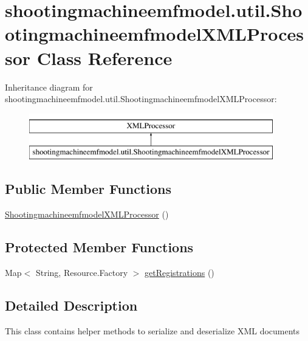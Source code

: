 \hypertarget{classshootingmachineemfmodel_1_1util_1_1_shootingmachineemfmodel_x_m_l_processor}{\section{shootingmachineemfmodel.\-util.\-Shootingmachineemfmodel\-X\-M\-L\-Processor Class Reference}
\label{classshootingmachineemfmodel_1_1util_1_1_shootingmachineemfmodel_x_m_l_processor}
}
Inheritance diagram for shootingmachineemfmodel.\-util.\-Shootingmachineemfmodel\-X\-M\-L\-Processor\-:\begin{figure}[H]
\begin{center}
\leavevmode
\includegraphics[height=2.000000cm]{classshootingmachineemfmodel_1_1util_1_1_shootingmachineemfmodel_x_m_l_processor}
\end{center}
\end{figure}
\subsection*{Public Member Functions}
\begin{DoxyCompactItemize}
\item 
\hyperlink{classshootingmachineemfmodel_1_1util_1_1_shootingmachineemfmodel_x_m_l_processor_a94ae9b5dca785e27cc81584508cf5a11}{Shootingmachineemfmodel\-X\-M\-L\-Processor} ()
\end{DoxyCompactItemize}
\subsection*{Protected Member Functions}
\begin{DoxyCompactItemize}
\item 
Map$<$ String, Resource.\-Factory $>$ \hyperlink{classshootingmachineemfmodel_1_1util_1_1_shootingmachineemfmodel_x_m_l_processor_a6e2f715c29a59ab32105d38ae067213a}{get\-Registrations} ()
\end{DoxyCompactItemize}


\subsection{Detailed Description}
This class contains helper methods to serialize and deserialize X\-M\-L documents

